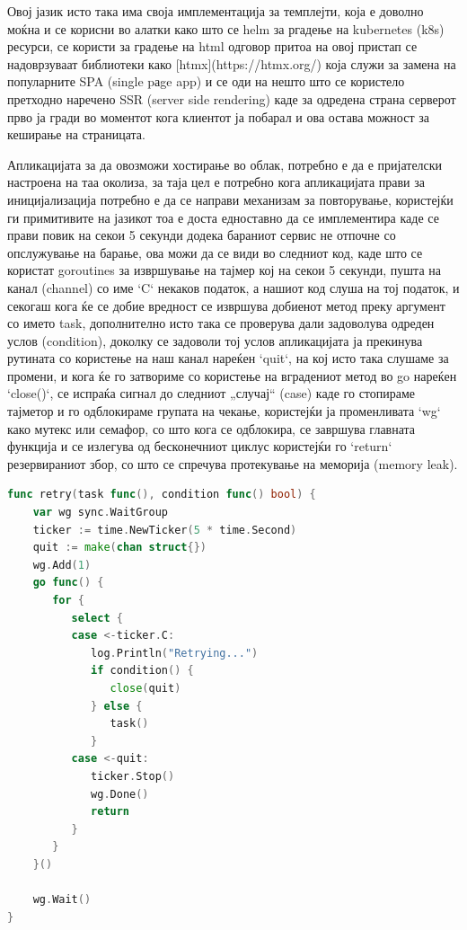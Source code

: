 \documentclass{article}
\begin{document}
Овој јазик исто така има своја имплементација за темплејти, која е доволно моќна и се корисни во алатки како што се helm за ргадење на kubernetes (k8s)  ресурси, се користи за градење на html одговор притоа на овој пристап се надоврзуваат библиотеки како [htmx](https://htmx.org/) која служи за замена на популарните SPA (single pаge app) и се оди на нешто што се користело претходно наречено SSR (server side rendering) каде за одредена страна серверот прво ја гради во моментот кога клиентот ја побарал и ова остава можност за кеширање на страницата.

Апликацијата за да овозможи хостирање во облак, потребно е да е пријателски настроена на таа околиза, за таја цел е потребно кога апликацијата прави за иницијализација потребно е да се направи механизам за повторување, користејќи ги примитивите на јазикот тоа е доста едноставно да се имплементира каде се прави повик на секои 5 секунди додека бараниот сервис не отпочне со опслужување на барање, ова можи да се види во следниот код, каде што се користат goroutines за извршување на тајмер кој на секои 5 секунди, пушта на канал (channel) со име `C` некаков податок, а нашиот код слуша на тој податок, и секогаш кога ќе се добие вредност се извршува добиенот метод преку аргумент со името task, дополнително исто така се проверува дали задоволува одреден услов (condition), доколку се задоволи тој услов апликацијата ја прекинува рутината со користење на наш канал нареќен `quit`,  на кој исто така слушаме за промени, и кога ќе го затвориме со користење на вградениот метод во go нареќен `close()`, се испраќа сигнал до следниот „случај“ (case) каде го стопираме тајметор и го одблокираме групата на чекање, користејќи ја променливата `wg` како мутекс или семафор, со што кога се одблокира, се завршува главната функција и се излегува од бесконечниот циклус користејќи го `return` резервираниот збор, со што се спречува протекување на меморија (memory leak).

\begin{lstlisting}[language=go]
func retry(task func(), condition func() bool) {  
    var wg sync.WaitGroup
    ticker := time.NewTicker(5 * time.Second)
    quit := make(chan struct{})
    wg.Add(1)
    go func() {
       for {
          select {
          case <-ticker.C:
             log.Println("Retrying...")
             if condition() {
                close(quit)
             } else {
                task()  
             }
          case <-quit:  
             ticker.Stop()  
             wg.Done()  
             return  
          }  
       }  
    }()  
  
    wg.Wait()
}
\end{lstlisting}
\end{document}
